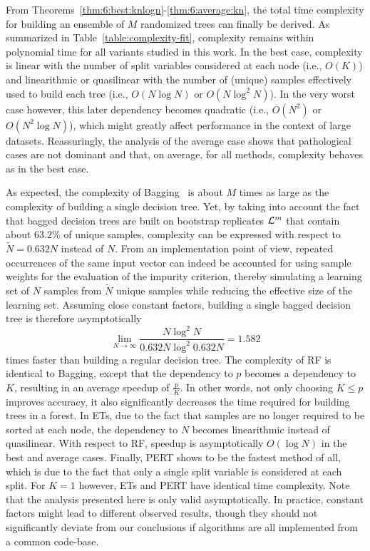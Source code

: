 From Theorems~\ref{thm:6:best:knlogn}-\ref{thm:6:average:kn}, the total time
complexity for building an ensemble of $M$ randomized trees can finally be
derived. As summarized in Table~\ref{table:complexity-fit}, complexity remains
within polynomial time for all variants studied in this work. In the best
case, complexity is linear with the number of split variables considered at
each node (i.e., $O(K)$) and linearithmic or quasilinear with the number of
(unique) samples effectively used to build each tree (i.e., $O(N\log N)$ or
$O(N\log^2 N)$). In the very worst case however, this later dependency becomes quadratic
(i.e., $O(N^2)$ or $O(N^2 \log N)$), which might greatly affect performance in
the context of large datasets. Reassuringly, the analysis of the average case
shows that pathological cases are not dominant and that, on average, for all methods, complexity
behaves as in the best case.

As expected, the complexity of Bagging~\citep{breiman:1996b} is about $M$ times
as large as the complexity of building a single decision tree. Yet, by taking
into account the fact that bagged decision trees are built on bootstrap
replicates ${\cal L}^m$ that contain about $63.2\%$ of unique samples,
complexity can be expressed with respect to $\widetilde{N} = 0.632 N$ instead
of $N$. From an implementation point of view, repeated occurrences of the same
input vector can indeed be accounted for using sample weights for the
evaluation of the impurity criterion, thereby  simulating a learning set of $N$
samples from $\widetilde{N}$ unique samples while reducing the effective size
of the learning set. Assuming close constant factors, building a single bagged
decision tree is therefore asymptotically
\begin{equation}
\lim_{N\to \infty} \frac{N\log^2 N}{0.632N \log^2 0.632N} = 1.582
\end{equation}
times faster than building a regular decision tree. The complexity of RF is
identical to Bagging, except that the dependency
to $p$ becomes a dependency to $K$, resulting in an average speedup of
$\tfrac{p}{K}$. In other words, not only choosing $K \leq p$ improves accuracy,
it also significantly decreases the time required for building trees in a
forest. In ETs, due to the fact that
samples are no longer required to be sorted at each node, the dependency to $N$
becomes linearithmic instead of quasilinear. With respect to RF,
speedup is asymptotically $O(\log N)$ in the best and average cases.
Finally, PERT shows to be the fastest
method of all, which is due to the fact that only a single split variable
is considered at each split. For $K=1$ however, ETs and PERT have identical
time complexity. Note that the analysis presented here is only valid
asymptotically. In practice, constant factors might lead to different
observed results, though they should not significantly deviate  from our conclusions if
algorithms are all implemented from a common code-base.

